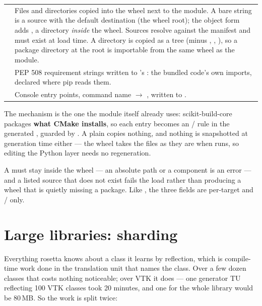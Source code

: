 \begin{center}
\small
\begin{tabular}{@{}lL{9.6cm}@{}}
\toprule
{} & Files and directories copied into the wheel next to
  the module. A bare string is a source with the default destination
   (the wheel root); the object form adds , a directory
  \emph{inside} the wheel. Sources resolve against the manifest and must
  exist at load time. A directory is copied as a tree (minus
  , , ), so a package
  directory at the root is importable from the same wheel as the module. \\
\addlinespace
{} & PEP 508 requirement strings written to
  's : the bundled code's
  own imports, declared where pip reads them. \\
\addlinespace
{} & Console entry points, command name $\to$
  , written to . \\
\bottomrule
\end{tabular}
\end{center}

The mechanism is the one the module itself already uses: scikit-build-core
packages \textbf{what CMake installs}, so each  entry
becomes an  / 
rule in the generated , guarded by .
A plain  copies nothing, and nothing is snapshotted at
generation time either --- the wheel takes the files as they are when
 runs, so editing the Python layer needs no regeneration.

A  must stay inside the wheel --- an absolute path or a
 component is an error --- and a listed source that does not exist
fails the load rather than producing a wheel that is quietly missing a
package. Like , the three fields are per-target and
 /  only.

\section{Large libraries: sharding}
\label{sec:sharding}

Everything rosetta knows about a class it learns by reflection, which is
compile-time work done in the translation unit that names the class. Over a few
dozen classes that costs nothing noticeable; over VTK it does --- one generator
TU reflecting 100 VTK classes took 20 minutes, and one 
for the whole library would be 80\,MB. So the work is split twice:

